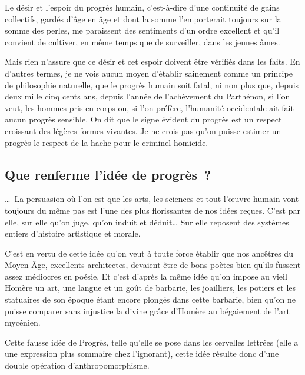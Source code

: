 \documentclass[french,twoside]{book} %
\newcommand{\astermono}{\medskip\centerline{\color{rubric}\large\selectfont{\syms ✻}}\medskip\par}%
\begin{document}
\noindent Le désir et l’espoir du progrès humain, c’est-à-dire d’une continuité de gains collectifs, gardés d’âge en âge et dont la somme l’emporterait toujours sur la somme des perles, me paraissent des sentiments d’un ordre excellent et qu’il convient de cultiver, en même temps que de surveiller, dans les jeunes âmes.\par
Mais rien n’assure que ce désir et cet espoir doivent être vérifiés dans les faits. En d’autres termes, je ne vois aucun moyen d’établir sainement comme un principe de philosophie naturelle, que le progrès humain soit fatal, ni non plus que, depuis deux mille cinq cents ans, depuis l’année de l’achèvement du Parthénon, si l’on veut, les hommes pris en corps ou, si l’on préfère, l’humanité occidentale ait fait aucun progrès sensible. On dit que le signe évident du progrès est un respect croissant des légères formes vivantes. Je ne crois pas qu’on puisse estimer un progrès le respect de la hache pour le criminel homicide.\par
\subsection[Que renferme l’idée de progrès ?]{Que renferme l’idée de progrès ?}
\noindent … La persuasion où l’on est que les arts, les sciences et tout l’œuvre humain vont toujours du même pas est l’une des plus florissantes de nos idées reçues. C’est par elle, sur elle qu’on juge, qu’on induit et déduit… Sur elle reposent des systèmes entiers d’histoire artistique et morale.\par
C’est en vertu de cette idée qu’on veut à toute force établir que nos ancêtres du Moyen Âge, excellents architectes, devaient être de bons poètes bien qu’ils fussent assez médiocres en poésie. Et c’est d’après la même idée qu’on impose au vieil Homère un art, une langue et un goût de barbarie, les joailliers, les potiers et les statuaires de son époque étant encore plongés dans cette barbarie, bien qu’on ne puisse comparer sans injustice la divine grâce d’Homère au bégaiement de l’art mycénien.\par

\astermono

\noindent Cette fausse idée de Progrès, telle qu’elle se pose dans les cervelles lettrées (elle a une expression plus sommaire chez l’ignorant), cette idée résulte donc d’une double opération d’anthropomorphisme.\par
\end{document}
